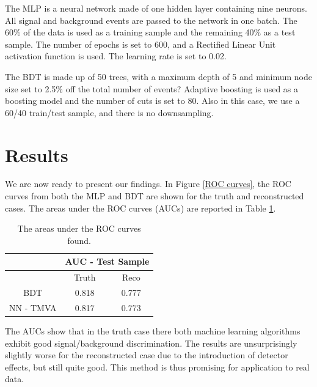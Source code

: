 \documentclass[10pt,a4paper]{book}
\begin{document}
The MLP is a neural network made of one hidden layer containing nine neurons. All signal and background events are passed to the network in one batch. The 60\% of the data is used as a training sample and the remaining 40\% as a test sample. The number of epochs is set to 600, and a Rectified Linear Unit activation function is used. The learning rate is set to 0.02. 

The BDT is made up of 50 trees, with a maximum depth of 5 and minimum node size set to 2.5\% off the total number of events? Adaptive boosting is used as a boosting model and the number of cuts is set to 80. Also in this case, we use a 60/40 train/test sample, and there is no downsampling.


\section{Results}

We are now ready to present our findings. In Figure \ref{ROC curves}, the ROC curves from both the MLP and BDT are shown for the truth and reconstructed cases. The areas under the ROC curves (AUCs) are reported in Table \ref{AUC table}.

\begin{table}
\centering
\begin{tabular}{|c|c|c|}
\hline 
\* & \multicolumn{2}{c|}{AUC - Test Sample} \\ 
\hline 
\* & Truth & Reco \\ 
\hline 
BDT & 0.818 & 0.777 \\ 
\hline 
NN - TMVA & 0.817 & 0.773 \\  
\hline 
\end{tabular} 
\caption{The areas under the ROC curves found.}
\label{AUC table}
\end{table} 

The AUCs show that in the truth case there both machine learning algorithms exhibit good signal/background discrimination. The results are unsurprisingly slightly worse for the reconstructed case due to the introduction of detector effects, but still quite good. This method is thus promising for application to real data.
\end{document}

